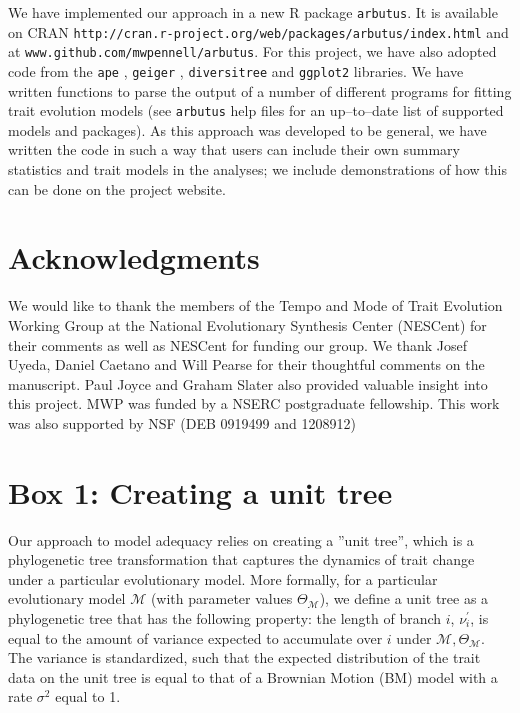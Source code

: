 \documentclass[a4paper,12pt]{article}
\begin{document}
We have implemented our approach in a new R package \texttt{arbutus}. It is available on CRAN \texttt{http://cran.r-project.org/web/packages/arbutus/index.html} and at \texttt{www.github.com/mwpennell/arbutus}. For this project, we have also adopted code from the \texttt{ape} \citep{ape}, \texttt{geiger} \citep{geiger2}, \texttt{diversitree} \citep{FitzJohn2012} and \texttt{ggplot2} \citep{ggplot2} libraries. We have written functions to parse the output of a number of different programs for fitting trait evolution models (see \texttt{arbutus} help files for an up--to--date list of supported models and packages). As this approach was developed to be general, we have written the code in such a way that users can include their own summary statistics and trait models in the analyses; we include demonstrations of how this can be done on the project website.

\section{Acknowledgments}
We would like to thank the members of the Tempo and Mode of Trait Evolution Working Group at the National Evolutionary Synthesis Center (NESCent) for their comments as well as NESCent for funding our group. We thank Josef Uyeda, Daniel Caetano and Will Pearse for their thoughtful comments on the manuscript. Paul Joyce and Graham Slater also provided valuable insight into this project. MWP was funded by a NSERC postgraduate fellowship. This work was also supported by NSF (DEB 0919499 and 1208912)

\newpage
\section{Box 1: Creating a unit tree}

Our approach to model adequacy relies on creating a ''unit tree'', which is a phylogenetic tree transformation that captures the dynamics of trait change under a particular evolutionary model. More formally, for a particular evolutionary model $\mathcal{M}$ (with parameter values $\Theta_{\mathcal{M}}$), we define a unit tree as a phylogenetic tree that has the following property: the length of branch $i$, $\nu_i ^\prime$, is equal to the amount of variance expected to accumulate over $i$ under $\mathcal{M}, \Theta_{\mathcal{M}}$. The variance is standardized, such that the expected distribution of the trait data on the unit tree is equal to that of a Brownian Motion (BM) model with a rate $\sigma^2$ equal to 1. 
\end{document}
